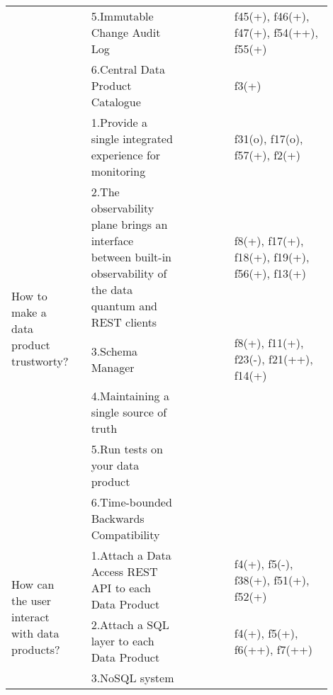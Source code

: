 \begin{tabular}{|p{0.12\linewidth}|p{0.015\linewidth}|p{0.3\linewidth}|p{0.15\linewidth}|p{0.31\linewidth}|}
 & \cellcolor{emerald_shape_7}{} & 5.Immutable Change Audit Log&\cellcolor{emerald_shape_4}{s4, s8, s12, s31, s32, s35, s36, s45, s47, s48, s53, s54} & f45(+), f46(+), f47(+), f54(++), f55(+)\\
 & \multirow{-6}{\linewidth}{ \cellcolor{emerald_shape_7}{39}} &6.Central Data Product Catalogue&\cellcolor{emerald_shape_5}{s5, s9, s15, s20, s23, s31, s32, s39, s40, s42, s45, s46, s47, s48, s53, s54} & f3(+)\\
\multirow{6}{\linewidth}{How to make a data product trustworty?} &\cellcolor{emerald_shape_6}{} &1.Provide a single integrated experience for monitoring&\cellcolor{emerald_shape_6}{s1, s3, s4, s5, s6, s9, s10, s11, s12, s19, s20, s22, s25, s28, s32, s33, s35, s36} & f31(o), f17(o), f57(+), f2(+)\\
 & \cellcolor{emerald_shape_6}{} & 2.The observability plane brings an interface between built-in observability of the data quantum and REST clients&\cellcolor{emerald_shape_3}{s3, s7, s11, s13, s22, s52} & f8(+), f17(+), f18(+), f19(+), f56(+), f13(+)\\
 & \cellcolor{emerald_shape_6}{} & 3.Schema Manager&\cellcolor{emerald_shape_5}{s3, s6, s7, s15, s16, s17, s19, s20, s24, s41, s47, s48, s54} & f8(+), f11(+), f23(-), f21(++), f14(+)\\
 & \cellcolor{emerald_shape_6}{} & 4.Maintaining a single source of truth&\cellcolor{emerald_shape_2}{s25, s29} & \\
 & \cellcolor{emerald_shape_6}{} & 5.Run tests on your data product&\cellcolor{emerald_shape_1}{s28} & \\
 & \multirow{-6}{\linewidth}{ \cellcolor{emerald_shape_6}{34}} &6.Time-bounded Backwards Compatibility&\cellcolor{emerald_shape_4}{s5, s8, s10, s17, s45, s50, s51} & \\
\multirow{3}{\linewidth}{How can the user interact with data products?} &\cellcolor{emerald_shape_6}{} &1.Attach a Data Access REST API to each Data Product&\cellcolor{emerald_shape_7}{s2, s3, s5, s6, s7, s8, s9, s15, s17, s18, s20, s30, s32, s33, s34, s36, s37, s38, s39, s41, s45, s49, s52} & f4(+), f5(-), f38(+), f51(+), f52(+)\\
 & \cellcolor{emerald_shape_6}{} & 2.Attach a SQL layer to each Data Product&\cellcolor{emerald_shape_6}{s2, s3, s5, s7, s10, s13, s14, s15, s16, s27, s30, s31, s32, s36, s37, s38, s39, s43, s48, s49} & f4(+), f5(+), f6(++), f7(++)\\
 & \multirow{-3}{\linewidth}{ \cellcolor{emerald_shape_6}{32}} &3.NoSQL system&\cellcolor{emerald_shape_2}{s14, s15} & \\

\end{tabular}
